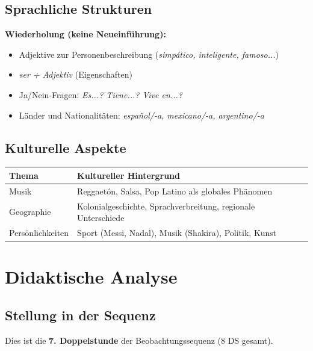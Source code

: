 \documentclass[11pt,a4paper]{article}
\begin{document}
\subsection{Sprachliche Strukturen}

\textbf{Wiederholung (keine Neueinführung):}
\begin{itemize}
    \item Adjektive zur Personenbeschreibung (\textit{simpático, inteligente, famoso...})
    \item \textit{ser + Adjektiv} (Eigenschaften)
    \item Ja/Nein-Fragen: \textit{\textquestiondown{}Es...? \textquestiondown{}Tiene...? \textquestiondown{}Vive en...?}
    \item Länder und Nationalitäten: \textit{español/-a, mexicano/-a, argentino/-a}
\end{itemize}

\subsection{Kulturelle Aspekte}

\begin{tabular}{|l|p{8cm}|}
\hline
\textbf{Thema} & \textbf{Kultureller Hintergrund} \\
\hline
Musik & Reggaetón, Salsa, Pop Latino als globales Phänomen \\
\hline
Geographie & Kolonialgeschichte, Sprachverbreitung, regionale Unterschiede \\
\hline
Persönlichkeiten & Sport (Messi, Nadal), Musik (Shakira), Politik, Kunst \\
\hline
\end{tabular}

\section{Didaktische Analyse}

\subsection{Stellung in der Sequenz}

Dies ist die \textbf{7. Doppelstunde} der Beobachtungssequenz (8 DS gesamt).
\end{document}
